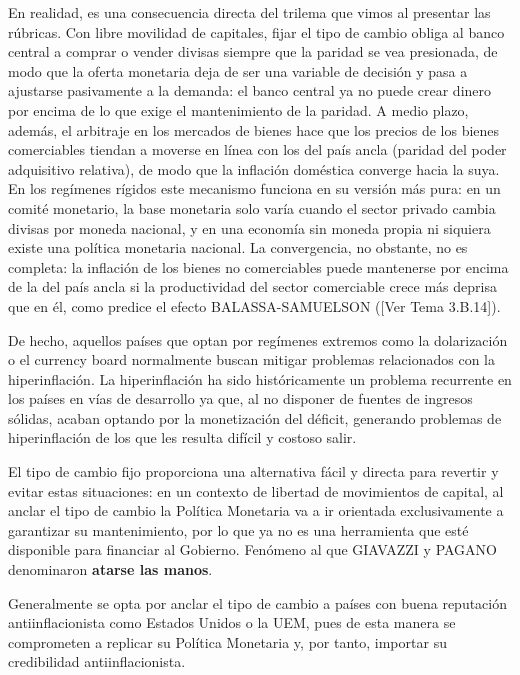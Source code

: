 \documentclass[10pt,a4paper]{article}
\newcommand{\authorfont}[1]{{\fontfamily{EBGaramond-TLF}\selectfont #1}}
\begin{document}
En realidad, es una consecuencia directa del trilema que vimos al presentar las rúbricas. Con libre movilidad de capitales, fijar el tipo de cambio obliga al banco central a comprar o vender divisas siempre que la paridad se vea presionada, de modo que la oferta monetaria deja de ser una variable de decisión y pasa a ajustarse pasivamente a la demanda: el banco central ya no puede crear dinero por encima de lo que exige el mantenimiento de la paridad. A medio plazo, además, el arbitraje en los mercados de bienes hace que los precios de los bienes comerciables tiendan a moverse en línea con los del país ancla (paridad del poder adquisitivo relativa), de modo que la inflación doméstica converge hacia la suya. En los regímenes rígidos este mecanismo funciona en su versión más pura: en un comité monetario, la base monetaria solo varía cuando el sector privado cambia divisas por moneda nacional, y en una economía sin moneda propia ni siquiera existe una política monetaria nacional. La convergencia, no obstante, no es completa: la inflación de los bienes no comerciables puede mantenerse por encima de la del país ancla si la productividad del sector comerciable crece más deprisa que en él, como predice el efecto BALASSA-SAMUELSON ([\authorfont{Ver Tema 3.B.14}]).

De hecho, aquellos países que optan por regímenes extremos como la dolarización o el currency board normalmente buscan mitigar problemas relacionados con la hiperinflación. La hiperinflación ha sido históricamente un problema recurrente en los países en vías de desarrollo ya que, al no disponer de fuentes de ingresos sólidas, acaban optando por la monetización del déficit, generando problemas de hiperinflación de los que les resulta difícil y costoso salir.

El tipo de cambio fijo proporciona una alternativa fácil y directa para revertir y evitar estas situaciones: en un contexto de libertad de movimientos de capital, al anclar el tipo de cambio la Política Monetaria va a ir orientada exclusivamente a garantizar su mantenimiento, por lo que ya no es una herramienta que esté disponible para financiar al Gobierno. Fenómeno al que GIAVAZZI y PAGANO denominaron \textbf{atarse las manos}. 

Generalmente se opta por anclar el tipo de cambio a países con buena reputación antiinflacionista como Estados Unidos o la UEM, pues de esta manera se comprometen a replicar su Política Monetaria y, por tanto, importar su credibilidad antiinflacionista.
\end{document}
